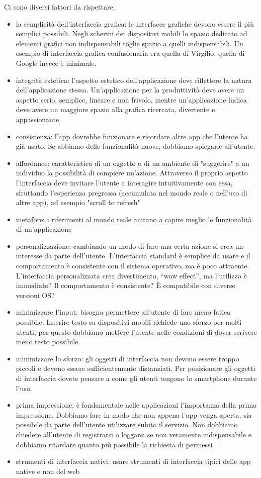 Ci sono diversi fattori da rispettare: 
\begin{itemize}
    \item la semplicità dell'interfaccia grafica: le interfacce grafiche devono essere il più semplici possibili. Negli schermi dei dispositivi mobili lo spazio dedicato ad elementi grafici non indispensabili toglie spazio a quelli indispensabili. 
    Un esempio di interfaccia grafica confusionaria era quella di Virgilio, quella di Google invece è minimale.
    \item integrità estetica: l'aspetto estetico dell'applicazione deve riflettere la natura dell'applicazione stessa. Un'applicazione per la produttività deve avere un aspetto serio, semplice, lineare e non frivolo, mentre un'applicazione ludica deve avere un maggiore spazio alla grafica ricercata, divertente e appassionante. 
    \item consistenza: l'app dovrebbe funzionare e ricordare altre app che l'utente ha già usato. 
    Se abbiamo delle funzionalità nuove, dobbiamo spiegarle all'utente. 
    \item affordance: caratteristica di un oggetto o di un ambiente di "suggerire" a un individuo la possibilità di compiere un'azione. Attraverso il proprio aspetto l'interfaccia deve invitare l'utente a interagire intuitivamente con essa, sfruttando l'esperienza pregressa (accumulata nel mondo reale o nell'uso di altre app), ad esempio "scroll to refresh"
    \item metafore: i riferimenti al mondo reale aiutano a capire meglio le funzionalità di un’applicazione
    \item personalizzazione: cambiando un modo di fare una certa azione si crea un interesse da parte dell'utente.
    L'interfaccia standard è semplice da usare e il comportamento è consistente con il sistema operativo, ma è poco attraente. L'interfaccia personalizzata crea divertimento, “wow effect”, ma l'utilizzo è immediato? Il comportamento è consistente? È compatibile con diverse versioni OS?
    \item minimizzare l'input: bisogna permettere all'utente di fare meno fatica possibile. Inserire testo su dispositivi mobili richiede uno sforzo per molti utenti, per questo dobbiamo mettere l'utente nelle condizioni di dover scrivere meno testo possibile. \item minimizzare lo sforzo: gli oggetti di interfaccia non devono essere troppo piccoli e devono essere sufficientemente distanziati. Per posizionare gli oggetti di interfaccia dovete pensare a come gli utenti tengono lo smartphone durante l’uso.
    \item prima impressione: è fondamentale nelle applicazioni l'importanza della prima impressione. Dobbiamo fare in modo che non appena l'app venga aperta, sia possibile da parte dell'utente utilizzare subito il servizio. Non dobbiamo chiedere all'utente di registrarsi o loggarsi se non veramente indispensabile e dobbiamo ritardare quanto più possibile la richiesta di permessi
    \item strumenti di interfaccia nativi: usare strumenti di interfaccia tipici delle app native e non del web
\end{itemize}

